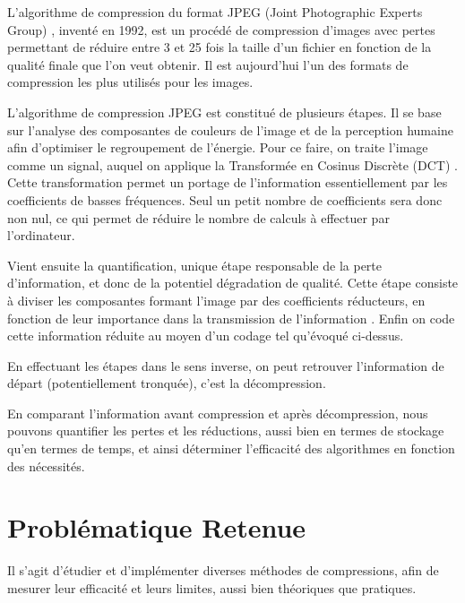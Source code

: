 \documentclass[a4paper, 11pt]{article}
\begin{document}
L'algorithme de compression du format JPEG (Joint Photographic Experts Group) \cite{jpeg}, inventé en 1992, est un procédé de compression d'images avec pertes permettant de réduire entre 3 et 25 fois la taille d'un fichier en fonction de la qualité finale que l'on veut obtenir. Il est aujourd'hui l'un des formats de compression les plus utilisés pour les images.

L'algorithme de compression JPEG est constitué de plusieurs étapes. Il se base sur l'analyse des composantes de couleurs de l'image et de la perception humaine afin d'optimiser le regroupement de l'énergie. Pour ce faire, on traite l'image comme un signal, auquel on applique la Transformée en Cosinus Discrète (DCT) \cite{jpeg}. Cette transformation permet un portage de l'information essentiellement par les coefficients de basses fréquences. Seul un petit nombre de coefficients sera donc non nul, ce qui permet de réduire le nombre de calculs à effectuer par l'ordinateur.

Vient ensuite la quantification, unique étape responsable de la perte d'information, et donc de la potentiel dégradation de qualité. Cette étape consiste à diviser les composantes formant l'image par des coefficients réducteurs, en fonction de leur importance dans la transmission de l'information \cite{code-theory} \cite{jpeg}. Enfin on code cette information \og réduite \fg au moyen d'un codage tel qu'évoqué ci-dessus.

En effectuant les étapes dans le sens inverse, on peut retrouver l'information de départ (potentiellement tronquée), c'est la décompression.

En comparant l'information avant compression et après décompression, nous pouvons quantifier les pertes et les réductions, aussi bien en termes de stockage qu'en termes de temps, et ainsi déterminer l'efficacité des algorithmes en fonction des nécessités.

\section*{Probl\'ematique Retenue}
Il s'agit d'étudier et d'implémenter diverses méthodes de compressions, afin de mesurer leur efficacité et leurs limites, aussi bien théoriques que pratiques.

\printbibliography[title=Références bibliographiques]
\end{document}
